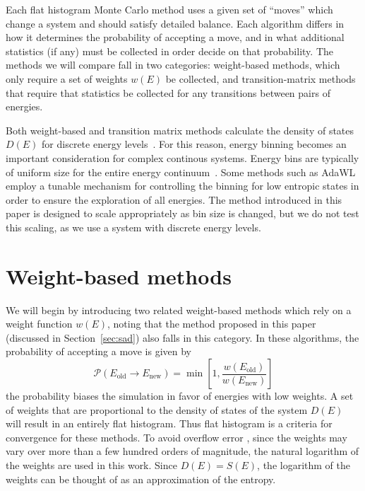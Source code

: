 \documentclass[letterpaper,twocolumn,amsmath,amssymb,pre,aps,10pt]{revtex4-1}
\begin{document}
Each flat histogram Monte Carlo method uses a given set of ``moves''
which change a system and should satisfy detailed balance.  Each
algorithm differs in how it determines the probability of accepting a
move, and in what additional statistics (if any) must be collected in
order decide on that probability.  The methods we will compare fall in
two categories:  weight-based methods, which only require a set of
weights $w(E)$ be collected, and transition-matrix methods that
require that statistics be collected for any transitions between pairs
of energies.

Both weight-based and transition matrix methods calculate
the density of states $D(E)$ for discrete energy
levels~\cite{haber2018performance}. For this reason, energy binning
becomes an important consideration for complex continous systems.
Energy bins are typically of uniform size for the entire energy
continuum~\cite{fasnacht2004adaptive}. Some methods such as
AdaWL~\cite{koh2013dynamically}
employ a tunable mechanism for controlling the binning for low entropic
states in order to ensure the exploration of all energies.  The method
introduced in this paper is designed to scale appropriately as bin size
is changed, but we do not test this scaling, as we use a system with
discrete energy levels.

\section{Weight-based methods}\label{sec:weight}

We will begin by introducing two related weight-based methods which
rely on a weight function $w(E)$, noting that the method proposed in
this paper (discussed in Section~\ref{sec:sad}) also falls in this
category.  In these algorithms, the probability of accepting a move is
given by
\begin{equation}
	\mathcal{P}(E_\text{old} \rightarrow E_\text{new})
	= \min\left[1,\frac{w(E_\text{old})}{w(E_\text{new})}\right]
\end{equation}
the probability biases the simulation in favor of energies with low weights.
A set of weights that are proportional to the density of states of the
system $D(E)$ will result in an entirely flat histogram.  Thus
flat histogram is a criteria for convergence for these methods.  To avoid
overflow error , since the weights may vary over more than a
few hundred orders of magnitude, the natural logarithm of the weights are used
in this work.  Since $D(E) = S(E)$, the logarithm of the weights
can be thought of as an approximation of the entropy.
\end{document}
